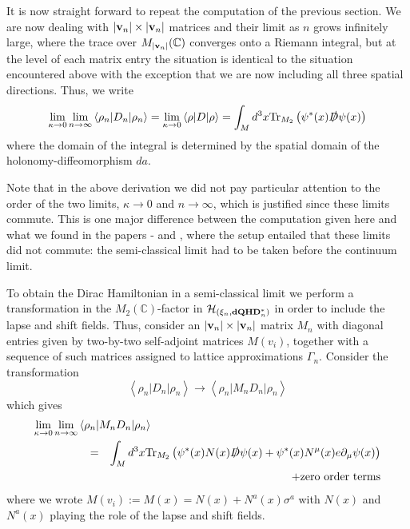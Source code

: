 \documentclass[12pt]{article}
\newcommand{\nn}{\nonumber}
\def\d{\delta}
\def\m{\mu}
\def\G{\Gamma}
\def\ch{{\cal H}}
\newcommand{\pa}{\partial}
\begin{document}
It is now straight forward to repeat the computation of the previous section. We are now dealing with $\vert {\bf v}_n\vert \times \vert {\bf v}_n\vert$ matrices and their limit as $n$ grows infinitely large, where the trace over $M_{\vert {\bf v}_n\vert}(\mathbb{C}) $ converges onto a Riemann integral, but at the level of each matrix entry the situation is identical to the situation encountered above with the exception that we are now including all three spatial directions. Thus, we write
\begin{equation}
\lim_{\kappa\rightarrow 0} \lim_{n\rightarrow\infty}  \left\langle \rho_n \vert D_n \vert \rho_n\right\rangle 
= \lim_{\kappa\rightarrow 0}   \left\langle \rho \vert D \vert \rho\right\rangle 
 =\int_M d^3x \mbox{Tr}_{M_2} \left(  \psi^*(x) \slashed{D} \psi(x)   \right)
\label{LIMLIM}
\end{equation}
where the domain of the integral is determined by the spatial domain of the holonomy-diffeomorphism $da$. 




Note that in the above derivation we did not pay particular attention to the order of the two limits, $\kappa\rightarrow0$ and $n\rightarrow\infty$, which is justified since these limits commute. This is one major difference between the computation given here and what we found in the papers \cite{Aastrup:2009dy}-\cite{Aastrup:2011dt} and \cite{AGNP1},
where the setup entailed that these limits did not commute: the semi-classical limit had to be taken before the continuum limit.



To obtain the Dirac Hamiltonian in a semi-classical limit we perform a transformation in the $M_2(\mathbb{C})$-factor in $\ch_{(\xi_n,\mathbf{dQHD}^*_n)}$ in order to include the lapse and shift fields. Thus, consider an $\vert {\bf v}_n\vert \times  \vert {\bf v}_n\vert$ matrix $M_n$ with diagonal entries given by two-by-two self-adjoint matrices $M(v_i)$, together with a sequence of such matrices assigned to lattice approximations $\G_n$. Consider the transformation
$$
\left\langle \rho_n \vert D_n \vert \rho_n\right\rangle \rightarrow \left\langle \rho_n \vert  M_n D_n \vert \rho_n\right\rangle 
$$
which gives
\begin{eqnarray}
\lim_{\kappa\rightarrow 0} \lim_{n\rightarrow\infty}  \left\langle \rho_n \vert M_n D_n \vert \rho_n\right\rangle 
\hspace{-2cm}&&
\nn\\
& =&  \int_M d^3x \mbox{Tr}_{M_2} \left(  \psi^*(x) N(x) \slashed{D} \psi(x)  +  \psi^*(x) N^\m(x) e \pa_\m \psi(x)  \right)
\nn\\
&&+\mbox{zero order terms}
\label{LIMLIM2}
\end{eqnarray}
where %
we wrote $M(v_i) := M(x) = N(x) + N^a(x)\sigma^a$ with $N(x)$ and $N^a(x)$ playing the role of the lapse and shift fields.
\end{document}
